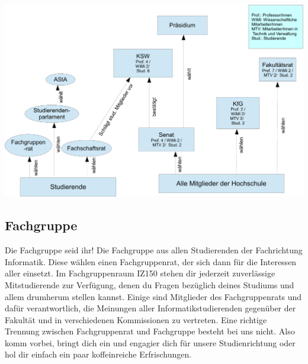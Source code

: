 \begin{center}
	\includegraphics[angle=90]{bilder/gremienkunde3}
\end{center}
\newpage
\subsection{Fachgruppe}
	\label{fachgruppe}
	Die Fachgruppe seid ihr! Die Fachgruppe aus allen Studierenden der Fachrichtung Informatik. Diese wählen einen Fachgruppenrat, der sich dann für die Interessen aller einsetzt. 
	Im Fachgruppenraum IZ150 stehen dir jederzeit zuverlässige Mitstudierende zur Verfügung, denen du Fragen bezüglich deines Studiums und allem drumherum stellen kannst. Einige sind Mitglieder des Fachgruppenrats und dafür verantwortlich, die Meinungen aller Informatikstudierenden gegenüber der Fakultät und in verschiedenen Kommissionen zu vertreten. Eine richtige Trennung zwischen Fachgruppenrat und Fachgruppe besteht bei uns nicht. Also komm vorbei, bringt dich ein und engagier dich für unsere Studienrichtung oder hol dir einfach ein paar koffeinreiche Erfrischungen. 
